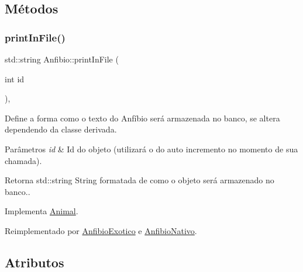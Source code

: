 \subsection{Métodos}
\mbox{\label{classAnfibio_a46f3f30c89af05bcdd39abbe692d854f}} 
\subsubsection{\texorpdfstring{print\+In\+File()}{printInFile()}}
{\footnotesize\ttfamily std\+::string Anfibio\+::print\+In\+File (\begin{DoxyParamCaption}\item[{int}]{id }\end{DoxyParamCaption})\hspace{0.3cm}{\ttfamily [protected]}, {\ttfamily [virtual]}}



Define a forma como o texto do Anfíbio será armazenada no banco, se altera dependendo da classe derivada. 


\begin{DoxyParams}{Parâmetros}
{\em id} & Id do objeto (utilizará o do auto incremento no momento de sua chamada). \\
\hline
\end{DoxyParams}
\begin{DoxyReturn}{Retorna}
std\+::string String formatada de como o objeto será armazenado no banco.. 
\end{DoxyReturn}


Implementa \hyperlink{classAnimal_ac75406040726a6339932d70164cc7242}{Animal}.



Reimplementado por \hyperlink{classAnfibioExotico_a08d9debec54258a0f43c8c503dfb23d0}{Anfibio\+Exotico} e \hyperlink{classAnfibioNativo_a7926e1af44542ee268e27dd3d862f583}{Anfibio\+Nativo}.



\subsection{Atributos}
\mbox{\label{classAnfibio_a994200134b0d314e3db0ac5c781bb7e7}} 
